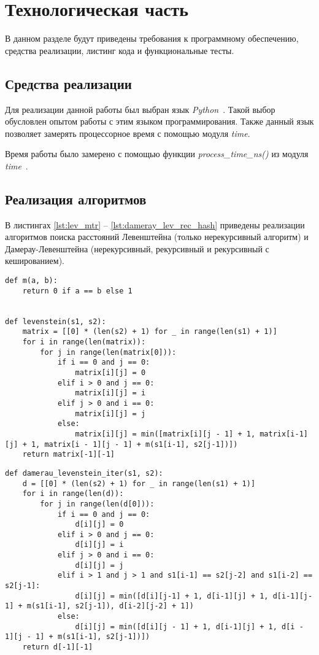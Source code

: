 \chapter{Технологическая часть}

В данном разделе будут приведены требования к программному обеспечению, средства реализации, листинг кода и функциональные тесты.

\section{Средства реализации}

Для реализации данной работы был выбран язык \textit{Python}~\cite{python}. Такой выбор обусловлен опытом работы с этим языком программирования. Также данный язык позволяет замерять процессорное время с помощью модуля \textit{time}.

Время работы было замерено с помощью функции \textit{process\_time\_ns()} из модуля \textit{time}~\cite{python-time}.

\section{Реализация алгоритмов}

В листингах \ref{lst:lev_mtr} -- \ref{lst:dameray_lev_rec_hash} приведены реализации алгоритмов поиска расстояний Левенштейна (только нерекурсивный алгоритм) и Дамерау-Левенштейна (нерекурсивный, рекурсивный и рекурсивный с кешированием).

\clearpage

\begin{lstlisting}[label=lst:lev_mtr,caption=Функция нахождения расстояния Левенштейна с использованием матрицы]
def m(a, b):
	return 0 if a == b else 1


def levenstein(s1, s2):
	matrix = [[0] * (len(s2) + 1) for _ in range(len(s1) + 1)]
	for i in range(len(matrix)):
		for j in range(len(matrix[0])):
			if i == 0 and j == 0:
				matrix[i][j] = 0
			elif i > 0 and j == 0:
				matrix[i][j] = i
			elif j > 0 and i == 0:
				matrix[i][j] = j
			else:
				matrix[i][j] = min([matrix[i][j - 1] + 1, matrix[i-1][j] + 1, matrix[i - 1][j - 1] + m(s1[i-1], s2[j-1])])
	return matrix[-1][-1]
\end{lstlisting}

\clearpage

\begin{lstlisting}[label=lst:dameray_lev_rec,caption=Функция нахождения расстояния Дамерау-Левенштейна с использованием матрицы]
def damerau_levenstein_iter(s1, s2):
	d = [[0] * (len(s2) + 1) for _ in range(len(s1) + 1)]
	for i in range(len(d)):
		for j in range(len(d[0])):
			if i == 0 and j == 0:
				d[i][j] = 0
			elif i > 0 and j == 0:
				d[i][j] = i
			elif j > 0 and i == 0:
				d[i][j] = j
			elif i > 1 and j > 1 and s1[i-1] == s2[j-2] and s1[i-2] == s2[j-1]:
				d[i][j] = min([d[i][j-1] + 1, d[i-1][j] + 1, d[i-1][j-1] + m(s1[i-1], s2[j-1]), d[i-2][j-2] + 1])
			else:
				d[i][j] = min([d[i][j - 1] + 1, d[i-1][j] + 1, d[i - 1][j - 1] + m(s1[i-1], s2[j-1])])
	return d[-1][-1]
\end{lstlisting}

